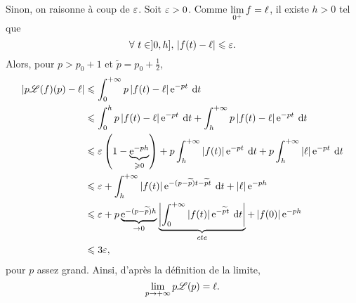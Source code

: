 \documentclass[oneside,11pt]{book}
\begin{document}
\begin{solution}
Sinon, on raisonne à coup de $\eg$. Soit $\eg > 0$. Comme $\dlim_{0^+} f = \ell$, il existe $h > 0$ tel que
\[
\pourtout t \in ]0, h],\, \abs{f(t) - \ell} \leq \eg.
\]
Alors, pour $p > p_0 + 1$ et $\tilde{p} = p_0 + \frac{1}{2}$,
\begin{align*}
\abs{p \LL(f)(p) - \ell} &\leq \dint_0^{+\infty} p \abs{f(t) - \ell} \e^{-p t} \dt \\
&\leq \dint_0^h p \abs{f(t) - \ell} \e^{-pt} \dt + \dint_h^{+\infty} p \abs{f(t) - \ell} \e^{-pt} \dt\\
&\leq \eg \left(1 - \underbrace{\e^{-p h}}_{\geq 0}\right)
+ p \dint_h^{+\infty} \abs{f(t)} \e^{-p t} \dt
+ p \dint_h^{+\infty} \abs{\ell} \e^{- p t} \dt \\
&\leq \eg
+ \dint_h^{+\infty} \abs{f(t)} \e^{-(p-\tilde{p})t - \tilde{p} t} \dt + \abs{\ell} \e^{-p h}\\
&\leq \eg + p \underbrace{\e^{-(p - \tilde{p}) h}}_{\to 0} \underbrace{\abs{\dint_0^{+\infty} \abs{f(t)} \e^{-\tilde{p} t} \dt}}_{cte} + \abs{f(0)} \e^{-ph} \\
&\leq 3 \eg,
\end{align*}
pour $p$ assez grand. Ainsi, d'après la définition de la limite,
\[
\dlim_{p\to +\infty} p \LL(p) = \ell.
\]
\end{solution}
\end{document}
